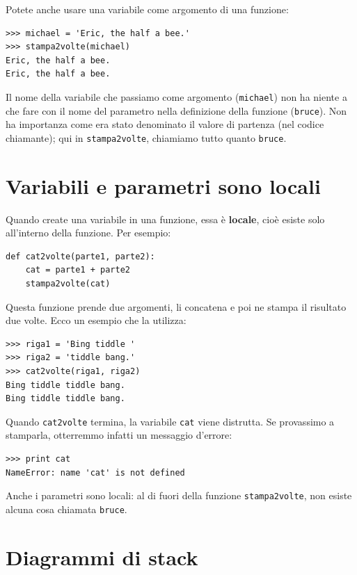 \documentclass[10pt]{book}
\begin{document}
Potete anche usare una variabile come argomento di una funzione:

\begin{verbatim}
>>> michael = 'Eric, the half a bee.'
>>> stampa2volte(michael)
Eric, the half a bee.
Eric, the half a bee.
\end{verbatim}
%
Il nome della variabile che passiamo come argomento ({\tt michael}) non ha niente a che fare con il nome del parametro nella definizione della funzione ({\tt bruce}).  Non ha importanza come era stato denominato il valore di partenza (nel codice chiamante); qui in \verb"stampa2volte", chiamiamo tutto quanto {\tt bruce}.


\section{Variabili e parametri sono locali}

Quando create una variabile in una funzione, essa è {\bf locale},
cioè esiste solo all'interno della funzione. Per esempio:

\begin{verbatim}
def cat2volte(parte1, parte2):
    cat = parte1 + parte2
    stampa2volte(cat)
\end{verbatim}
%
Questa funzione prende due argomenti, li concatena e poi ne stampa il risultato due volte. Ecco un esempio che la utilizza:

\begin{verbatim}
>>> riga1 = 'Bing tiddle '
>>> riga2 = 'tiddle bang.'
>>> cat2volte(riga1, riga2)
Bing tiddle tiddle bang.
Bing tiddle tiddle bang.
\end{verbatim}
%
Quando \verb"cat2volte" termina, la variabile {\tt cat} viene distrutta. Se provassimo a stamparla, otterremmo infatti un messaggio d'errore:

\begin{verbatim}
>>> print cat
NameError: name 'cat' is not defined
\end{verbatim}
%
Anche i parametri sono locali: al di fuori della funzione \verb"stampa2volte", non esiste alcuna cosa chiamata {\tt bruce}.


\section{Diagrammi di stack}
\label{stackdiagram}
\end{document}
